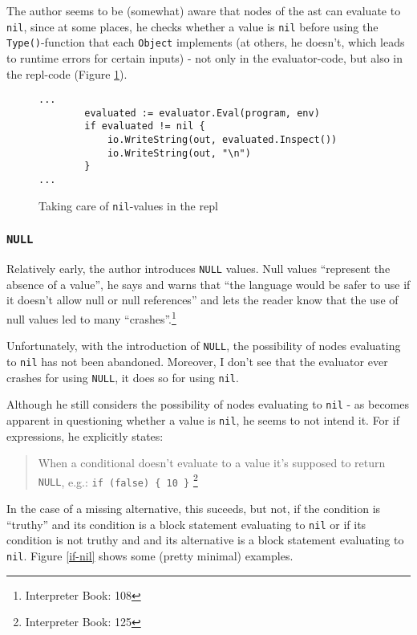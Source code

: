 \documentclass[a4paper,10pt]{article}
\begin{document}
\clearpage


The author seems to be (somewhat) aware that nodes of the ast can evaluate to {\tt nil}, since at some places, he checks whether a value is {\tt nil} before using the {\tt Type()}-function that each {\tt Object} implements (at others, he doesn't, which leads to runtime errors for certain inputs) - not only in the evaluator-code, but also in the repl-code (Figure \ref{repl-nil}).

\begin{figure}[h]
\begin{tcolorbox}\small
\begin{verbatim}
...
        evaluated := evaluator.Eval(program, env)
        if evaluated != nil {
            io.WriteString(out, evaluated.Inspect())
            io.WriteString(out, "\n")
        }
...
\end{verbatim}
\end{tcolorbox}
 \caption{Taking care of {\tt nil}-values in the repl}
  \label{repl-nil}
\end{figure}





\subsubsection{\tt NULL}
Relatively early, the author introduces {\tt NULL} values. Null values ``represent the absence of a value'', he says and warns that ``the language would
be safer to use if it doesn’t allow null or null references'' and lets the reader know that the use of null values led to many ``crashes''.\footnote{Interpreter Book: 108}

Unfortunately, with the introduction of {\tt NULL}, the possibility of nodes evaluating to {\tt nil} has not been abandoned. Moreover,
I don't see that the evaluator ever crashes for using {\tt NULL}, it does so for using {\tt nil}.

Although he still considers the possibility of nodes evaluating to {\tt nil} - as becomes apparent in questioning whether a value is {\tt nil}, he seems to not intend it. For if expressions, he explicitly states:

\begin{quote}
 When a conditional
doesn’t evaluate to a value it’s supposed to return {\tt NULL}, e.g.:
\verb+if (false) { 10 }+ \footnote{Interpreter Book: 125}
\end{quote}

In the case of a missing alternative, this suceeds, but not, if the condition is ``truthy'' and its condition is a block statement evaluating to {\tt nil} or if its condition is not truthy and 
and its alternative  is a block statement evaluating to {\tt nil}.
Figure \ref{if-nil} shows some (pretty minimal) examples.
\end{document}

